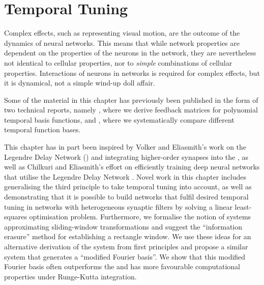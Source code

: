 \chapter{Temporal Tuning}
\label{chp:temporal_tuning}

\vspace{20pt}

\begin{OpeningQuote}
Complex effects, such as representing visual motion, are the outcome of the dynamics of neural networks. This means that while network properties are dependent on the properties of the neurons in the network, they are nevertheless not identical to cellular properties, nor to \emph{simple} combinations of cellular properties. Interactions of neurons in networks is required for complex effects, but it is dynamical, not a simple wind-up doll affair.
\end{OpeningQuote}

\begin{PriorPublication}
Some of the material in this chapter has previously been published in the form of two technical reports, namely \citet{stockel2021constructing}, where we derive feedback matrices for polynomial temporal basis functions, and \citet{stockel2021discrete}, where we systematically compare different temporal function bases.
\end{PriorPublication}

\begin{Contributions}
This chapter has in part been inspired by Volker and Eliasmith's work on the Legendre Delay Network (\LDN) and integrating higher-order synapses into the \NEF \citep{voelker2018improving,voelker2019}, as well as Chilkuri and Eliasmith's effort on efficiently training deep neural networks that utilise the Legendre Delay Network \citep{chilkuri2021parallelizing}.
Novel work in this chapter includes generalising the third \NEF principle to take temporal tuning into account, as well as demonstrating that it is possible to build networks that fulfil desired temporal tuning in networks with heterogeneous synaptic filters by solving a linear least-squares optimisation problem.
Furthermore, we formalise the notion of \LTI systems approximating sliding-window transformations and suggest the \enquote{information erasure} method for establishing a rectangle window.
We use these ideas for an alternative derivation of the \LDN \LTI system from first principles and propose a similar \LTI system that generates a \enquote{modified Fourier basis}.
We show that this modified Fourier basis often outperforms the \LDN \LTI and has more favourable computational properties under Runge-Kutta integration.
\end{Contributions}

